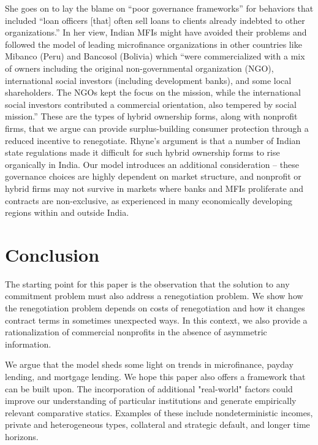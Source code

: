 \documentclass[11pt,english]{article}
\theoremstyle{plain}
\theoremstyle{definition}
\begin{document}
She goes on to lay the blame on ``poor governance frameworks\textquotedblright{}
for behaviors that included ``loan officers {[}that{]} often sell
loans to clients already indebted to other organizations.'' In her
view, Indian MFIs might have avoided their problems and followed the
model of leading microfinance organizations in other countries like
Mibanco (Peru) and Bancosol (Bolivia) which ``were commercialized
with a mix of owners including the original non-governmental organization
(NGO), international social investors (including development banks),
and some local shareholders. The NGOs kept the focus on the mission,
while the international social investors contributed a commercial
orientation, also tempered by social mission.'' These are the types
of hybrid ownership forms, along with nonprofit firms, that we argue
can provide surplus-building consumer protection through a reduced
incentive to renegotiate. Rhyne's argument is that a number of Indian
state regulations made it difficult for such hybrid ownership forms
to rise organically in India. Our model introduces an additional consideration -- these governance
choices are highly dependent on market structure, and nonprofit or hybrid firms may not survive in markets where banks and MFIs proliferate and contracts are non-exclusive, as experienced in many economically developing regions within and outside India.

\section{Conclusion}

The starting point for this paper is the observation that the solution
to any commitment problem must also address a renegotiation problem.
We show how the renegotiation problem depends on costs of renegotiation
and how it changes contract terms in sometimes unexpected ways. In
this context, we also provide a rationalization of commercial nonprofits
in the absence of asymmetric information.

We argue that the model sheds some light on trends in microfinance,
payday lending, and mortgage lending. We hope this paper also offers
a framework that can be built upon. The incorporation of additional
"real-world" factors could improve our understanding of particular
institutions and generate empirically relevant comparative statics.
Examples of these include nondeterministic incomes, private and heterogeneous types, collateral and strategic default, and longer time horizons.
\end{document}
